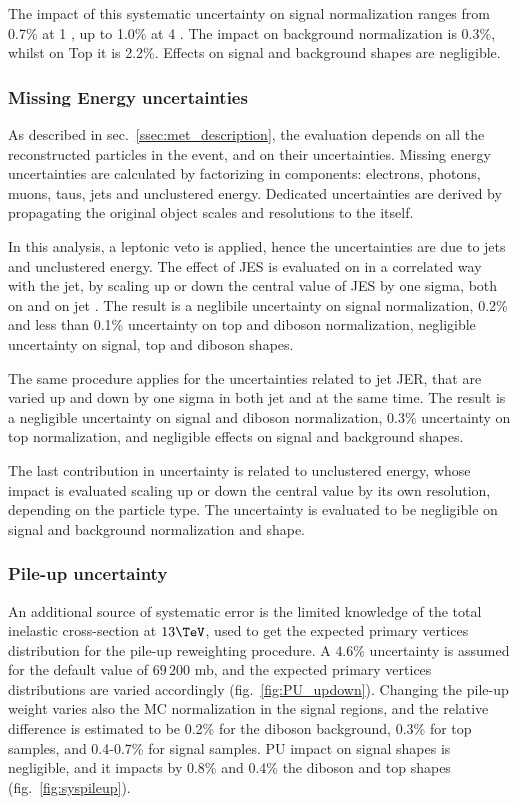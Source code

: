 \noindent The impact of this systematic uncertainty on signal normalization ranges from 0.7\% at 1 \TeV, up to 1.0\% at 4 \TeV. The impact on \VV background normalization is 0.3\%, whilst on Top it is 2.2\%. Effects on signal and background shapes are negligible.

\subsubsection{Missing Energy uncertainties}
\label{metuncsec}
As described in sec.~\ref{ssec:met_description}, the \MET evaluation depends on all the reconstructed particles in the event, and on their uncertainties. Missing energy uncertainties are calculated by factorizing \met in components: electrons, photons, muons, taus, jets and unclustered energy. Dedicated uncertainties are derived by propagating the original object scales and resolutions to the \MET itself.

\noindent In this analysis, a leptonic veto is applied, hence the \MET uncertainties are due to jets and unclustered energy. The effect of JES is evaluated on \MET in a correlated way with the jet, by scaling up or down the central value of JES by one sigma, both on \MET and on jet \pt. The result is a neglibile uncertainty on signal normalization, 0.2\% and less than 0.1\% uncertainty on top and diboson normalization, negligible uncertainty on signal, top and diboson shapes.

\noindent The same procedure applies for the uncertainties related to jet JER, that are varied up and down by one sigma in both jet and \met at the same time. The result is a negligible uncertainty on signal and diboson normalization, 0.3\% uncertainty on top normalization, and negligible effects on signal and background shapes.

\noindent The last contribution in \met uncertainty is related to unclustered energy, whose impact is evaluated scaling up or down the central value by its own resolution, depending on the particle type. The uncertainty is evaluated to be negligible on signal and background normalization and shape.

\subsubsection{Pile-up uncertainty}
An additional source of systematic error is the limited knowledge of the total inelastic cross-section at $13 \TeV$, used to get the expected primary vertices distribution for the pile-up reweighting procedure. A $4.6\%$ uncertainty is assumed for the default value of $69\,200$ mb, and the expected primary vertices distributions are varied accordingly (fig.~\ref{fig:PU_updown}). Changing the pile-up weight varies also the MC normalization in the signal regions, and the relative difference is estimated to be 0.2\% for the diboson background, 0.3\% for top samples, and 0.4-0.7\% for signal samples. PU impact on signal shapes is negligible, and it impacts by 0.8\% and 0.4\% the diboson and top shapes (fig.~\ref{fig:syspileup}). %

